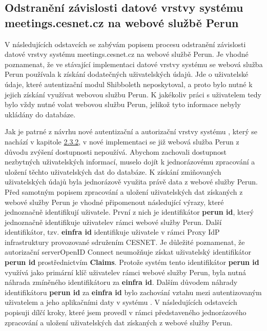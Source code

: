 \documentclass[
  printed, %
  twoside, %
  table,   %
  nolof,     %
  nolot,     %
]{fithesis3}
\begin{document}
\subsection[Odstranění závislosti datové vrstvy systému\break meetings.cesnet.cz na webové službě Perun]{Odstranění závislosti datové vrstvy systému meetings.cesnet.cz na webové službě Perun}
\label{zpracovaniAUlozeniPerun}
V následujících odstavcích se zabývám popisem procesu odstranění závislosti datové vrstvy systému meetings.cesnet.cz na webové službě Perun. Je vhodné poznamenat, že ve stávající implementaci datové vrstvy systému  se webová služba Perun používala k získání dodatečných uživatelských údajů. Jde o uživatelské údaje, které autentizační modul Shibboleth neposkytoval, a proto bylo nutné k jejich získání využívat webovou službu Perun. K jakékoliv práci s uživatelem tedy bylo vždy nutné volat webovou službu Perun, jelikož tyto informace nebyly ukládány do databáze. 

\par 

Jak je patrné z návrhu nové autentizační a autorizační vrstvy systému , který se nachází v kapitole \hyperref[shong-proposal]{2.3.2}, v nové implementaci se již webová služba Perun z důvodu zvýšení dostupnosti nepoužívá. Abychom zachovali dostupnost nezbytných uživatelských informací, muselo dojít k jednorázovému zpracování a uložení těchto uživatelských dat do databáze. K získání zmiňovaných uživatelských údajů byla jednorázově využita právě data z webové služby Perun. Před samotným popisem zpracování a uložení uživatelských dat získaných z webové služby Perun je vhodné připomenout následující výrazy, které jednoznačně identifikují uživatele. První z nich je identifikátor \textbf{perun id}, který jednoznačně identifikuje uživatele\break v rámci webové služby Perun. Další identifikátor, tzv. \textbf{einfra id} identifikuje uživatele v rámci Proxy IdP infrastruktury provozované sdružením CESNET. Je důležité poznamenat, že autorizační server\break OpenID Connect neumožňuje získat uživatelský identifikátor \textbf{perun id} prostřednictvím \textbf{Claims}. Protože systém  tento identifikátor \textbf{perun id} využívá jako primární klíč uživatele\break v rámci webové služby Perun, byla nutná náhrada zmíněného identifikátoru za \textbf{einfra id}. Dalším důvodem náhrady identifikátoru \textbf{perun id} za \textbf{einfra id} bylo zachování vztahu mezi autentizovaným uživatelem a jeho aplikačními daty v systému . V následujících odstavcích popisuji dílčí kroky, které jsem provedl v rámci představeného jednorázového zpracování a uložení uživatelských dat získaných z webové služby Perun. 
\end{document}
